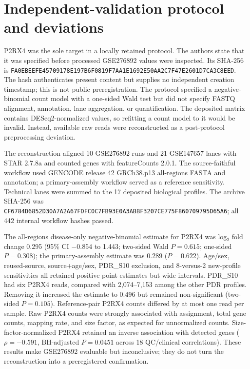\documentclass[12pt]{article}
\begin{document}
\section{Independent-validation protocol and deviations}

P2RX4 was the sole target in a locally retained protocol. The authors state that it was specified before processed GSE276892 values were inspected. Its SHA-256 is {\footnotesize\texttt{FA0EBEEF\allowbreak E4570917\allowbreak 8E197B6F\allowbreak 0819F7AA\allowbreak 1E1692E5\allowbreak 0AA2C7F4\allowbreak 7E2601D7\allowbreak CA3C8EED}}. The hash authenticates present content but supplies no independent creation timestamp; this is not public preregistration. The protocol specified a negative-binomial count model with a one-sided Wald test but did not specify FASTQ alignment, annotation, lane aggregation, or quantification. The deposited matrix contains DESeq2-normalized values, so refitting a count model to it would be invalid. Instead, available raw reads were reconstructed as a post-protocol preprocessing deviation.

The reconstruction aligned 10 GSE276892 runs and 21 GSE147657 lanes with STAR 2.7.8a and counted genes with featureCounts 2.0.1. The source-faithful workflow used GENCODE release 42 GRCh38.p13 all-regions FASTA and annotation; a primary-assembly workflow served as a reference sensitivity. Technical lanes were summed to the 17 deposited biological profiles. The archive SHA-256 was {\footnotesize\texttt{CF6784D6\allowbreak 852D30A7\allowbreak A2A67FDF\allowbreak C0C7FB93\allowbreak E0A3ABBF\allowbreak 3207CE77\allowbreak 5F860709\allowbreak 795D65A6}}; all 442 internal workflow hashes passed.

The all-regions disease-only negative-binomial estimate for P2RX4 was log$_2$ fold change 0.295 (95\% CI $-0.854$ to 1.443; two-sided Wald $P=0.615$; one-sided $P=0.308$); the primary-assembly estimate was 0.289 ($P=0.622$). Age/sex, reused-source, source+age/sex, PDR\_S10 exclusion, and 8-versus-2 new-profile sensitivities all retained positive point estimates but wide intervals. PDR\_S10 had six P2RX4 reads, compared with 2,074--7,153 among the other PDR profiles. Removing it increased the estimate to 0.496 but remained non-significant (two-sided $P=0.105$). Reference-pair P2RX4 counts differed by at most one read per sample. Raw P2RX4 counts were strongly associated with assignment, total gene counts, mapping rate, and size factor, as expected for unnormalized counts. Size-factor-normalized P2RX4 retained an inverse association with detected genes ($\rho=-0.591$, BH-adjusted $P=0.0451$ across 18 QC/clinical correlations). These results make GSE276892 evaluable but inconclusive; they do not turn the reconstruction into a preregistered confirmation.
\end{document}
